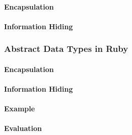 \paragraph{Encapsulation}\label{par:Objective_C_Encapsulation}
\paragraph{Information Hiding}\label{par:Objective_C_Info_Hiding}

\subsubsection{Abstract Data Types in Ruby}\label{subsubsec:Abstract_Data_Types_Ruby}
\paragraph{Encapsulation}\label{par:Ruby_Encapsulation}
\paragraph{Information Hiding}\label{par:Ruby_Info_Hiding}
\paragraph{Example}\label{par:Ruby_Abstract_Data_Type_Example}
\paragraph{Evaluation}\label{par:Ruby_Abstract_Data_Type_Evaluation}
